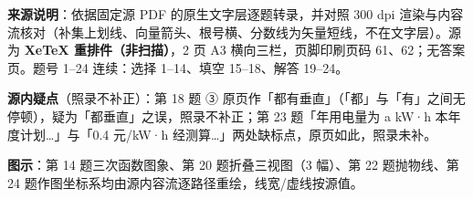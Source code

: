 


\begin{gktip}
\textbf{来源说明}：依据固定源 PDF 的原生文字层逐题转录，并对照 300 dpi 渲染与内容流核对（补集上划线、向量箭头、根号横、分数线为矢量短线，不在文字层）。源为 \textbf{XeTeX 重排件（非扫描）}，2 页 A3 横向三栏，页脚印刷页码 61、62；无答案页。题号 1–24 连续：选择 1–14、填空 15–18、解答 19–24。

\textbf{源内疑点}（照录不补正）：第 18 题 ③ 原页作「都有垂直」（「都」与「有」之间无停顿），疑为「都垂直」之误，照录不补正；第 23 题「年用电量为 a kW·h 本年度计划…」与「0.4 元/kW·h 经测算…」两处缺标点，原页如此，照录未补。

\textbf{图示}：第 14 题三次函数图象、第 20 题折叠三视图（3 幅）、第 22 题抛物线、第 24 题作图坐标系均由源内容流逐路径重绘，线宽/虚线按源值。
\end{gktip}


